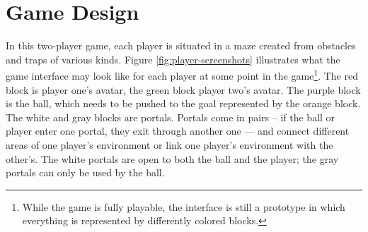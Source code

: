 \section{Game Design}

In this two-player game, each player is situated in a maze created
from obstacles and traps of various kinds.  Figure
\ref{fig:player-screenshots} illustrates what the game interface may
look like for each player at some point in the
game\footnote{While the game is fully playable, the interface is still
  a prototype in which everything is represented by differently
  colored blocks.}. The red block is player one's avatar, the green
block player two's avatar. The purple block is the ball, which needs
to be pushed to the goal represented by the orange block. The white
and gray blocks are portals. Portals come in pairs -- if the ball or
player enter one portal, they exit through another one --- and connect
different areas of one player's environment or link one player's
environment with the other's. The white portals are open to both the
ball and the player; the gray portals can only be used by the ball.


